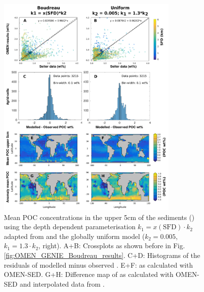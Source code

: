 \documentclass[gmd, manuscript]{copernicus}
\begin{document}
\begin{figure}[htbp]
\begin{center}
	\includegraphics[width=0.8\textwidth]{figures/OMEN-GENIE-Exp/0_2908_BOUDREAU_DEPTH_DEP_POC_BigTriangles_SWITCH_190418.pdf}
	\caption{Mean POC concentrations in the upper 5cm of the sediments () using the depth dependent parameterisation $k_1 = x(\mathrm{SFD}) \cdot k_2$ 
	adapted from \citet[][left]{boudreau1997diagenetic} and the globally uniform model ($k_2 = 0.005$, $k_1 = 1.3\cdot k_2$, right). 
	A+B: Crossplots as shown before in Fig. \ref{fig:OMEN_GENIE_Boudreau_results}. 
	C+D: Histograms of the residuals of modelled minus observed . 
	E+F:  as calculated with OMEN-SED. 
	G+H: Difference map of  as calculated with OMEN-SED and interpolated data from \citet{seiter_organic_2004}.
	}\label{fig:OMEN_GENIE_Boudreau_depth}
\end{center}
\end{figure}
\end{document}
